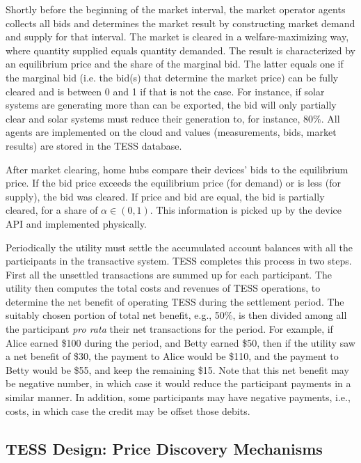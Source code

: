 Shortly before the beginning of the market interval, the market operator agents collects all bids and determines the market result by constructing market demand and supply for that interval. The market is cleared in a welfare-maximizing way, where quantity supplied equals quantity demanded. The result is characterized by an equilibrium price and the share of the marginal bid. The latter equals one if the marginal bid (i.e. the bid(s) that determine the market price) can be fully cleared and is between 0 and 1 if that is not the case. For instance, if solar systems are generating more than can be exported, the bid will only partially clear and solar systems must reduce their generation to, for instance, 80\%. All agents are implemented on the cloud and values (measurements, bids, market results) are stored in the TESS database.

After market clearing, home hubs compare their devices' bids to the equilibrium price. If the bid price exceeds the equilibrium price (for demand) or is less (for supply), the bid was cleared. If price and bid are equal, the bid is partially cleared, for a share of $\alpha \in (0,1)$. This information is picked up by the device API and implemented physically.

Periodically the utility must settle the accumulated account balances with all the participants in the transactive system.  TESS completes this process in two steps. First all the unsettled transactions are summed up for each participant.  The utility then computes the total costs and revenues of TESS operations, to determine the net benefit of operating TESS during the settlement period.  The suitably chosen portion of total net benefit, e.g., 50\%, is then divided among all the participant \textit{pro rata} their net transactions for the period.  For example, if Alice earned \$100 during the period, and Betty earned \$50, then if the utility saw a net benefit of \$30, the payment to Alice would be \$110, and the payment to Betty would be \$55, and keep the remaining \$15. Note that this net benefit may be negative number, in which case it would reduce the participant payments in a similar manner. In addition, some participants may have negative payments, i.e., costs, in which case the credit may be offset those debits. 

\subsection{TESS Design: Price Discovery Mechanisms}\label{sec:price_discovery}

